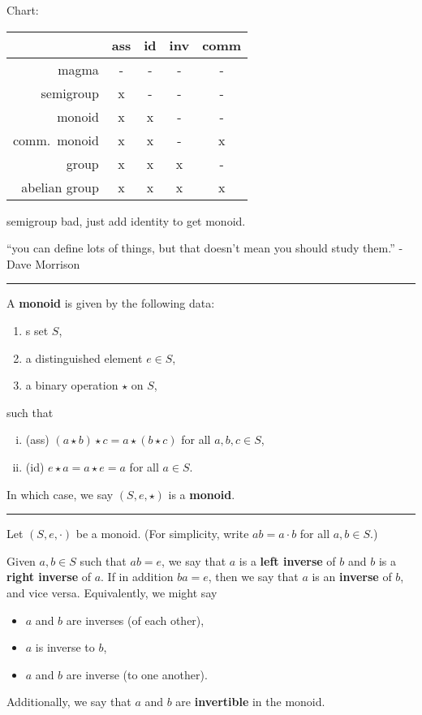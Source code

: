 \documentclass[12pt]{article}
\newcommand{\keyword}[1]{\textbf{#1}}
\newcommand{\sepline}{\rule{\textwidth}{0.4pt}}
\theoremstyle{definition}
\newcommand{\<}{\left\langle}
\renewcommand{\>}{\right\rangle}
\begin{document}
Chart:
\begin{center}
    \begin{tabular}{r|cccc}
         & ass & id & inv & comm \\
            \hline
        magma & - & - & - & - \\
        semigroup & x & - & - & - \\
        monoid & x & x & - & - \\
        comm.\ monoid & x & x & - & x \\
        group & x & x & x & - \\
        abelian group & x & x & x & x \\
    \end{tabular}
\end{center}

semigroup bad, just add identity to get monoid.

``you can define lots of things, but that doesn't mean you should study them.'' - Dave Morrison

\sepline

A \keyword{monoid} is given by the following data:
\begin{enumerate}[(1)]
    \item s set $S$,
    \item a distinguished element $e \in S$,
    \item a binary operation $\star$ on $S$,
\end{enumerate}
such that
\begin{enumerate}[(i)]
    \item (ass) $(a \star b) \star c = a \star (b \star c)$ for all $a, b, c \in S$,
    \item (id) $e \star a = a \star e = a$ for all $a \in S$.
\end{enumerate}
In which case, we say $(S, e, \star)$ is a \keyword{monoid}.

\sepline

Let $(S, e, \cdot)$ be a monoid.
(For simplicity, write $ab = a \cdot b$ for all $a, b \in S$.)

Given $a, b \in S$ such that $ab = e$, we say that $a$ is a \keyword{left inverse} of $b$ and $b$ is a \keyword{right inverse} of $a$.
If in addition $ba = e$, then we say that $a$ is an \keyword{inverse} of $b$, and vice versa.
Equivalently, we might say
\begin{itemize}[nosep]
    \item $a$ and $b$ are inverses (of each other),
    \item $a$ is inverse to $b$,
    \item $a$ and $b$ are inverse (to one another).
\end{itemize}
Additionally, we say that $a$ and $b$ are \keyword{invertible} in the monoid.
\end{document}
